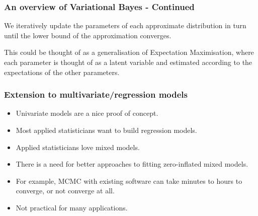 \documentclass{beamer}
\begin{document}
\begin{frame}
	\frametitle{An overview of Variational Bayes - Continued}
	We iteratively update the parameters of each approximate distribution
	in turn until the lower bound of the approximation converges.
	
	\bigskip 
	This could be thought of as a generalisation of Expectation Maximisation, where each parameter is thought of as a latent
	variable and estimated according to the expectations of the other parameters.
\end{frame}

\begin{frame}
	\frametitle{Extension to multivariate/regression models}
	\begin{itemize}
		\item Univariate models are a nice proof of concept.
		\item Most applied statisticians want to build regression models.
		\item Applied statisticians love mixed models.
		\item There is a need for better approaches to fitting zero-inflated mixed models.
		\item For example, MCMC with existing software can take minutes to hours 
		      to converge, or not converge at all.
		\item Not practical for many applications.
	\end{itemize}
\end{frame}
\end{document}

